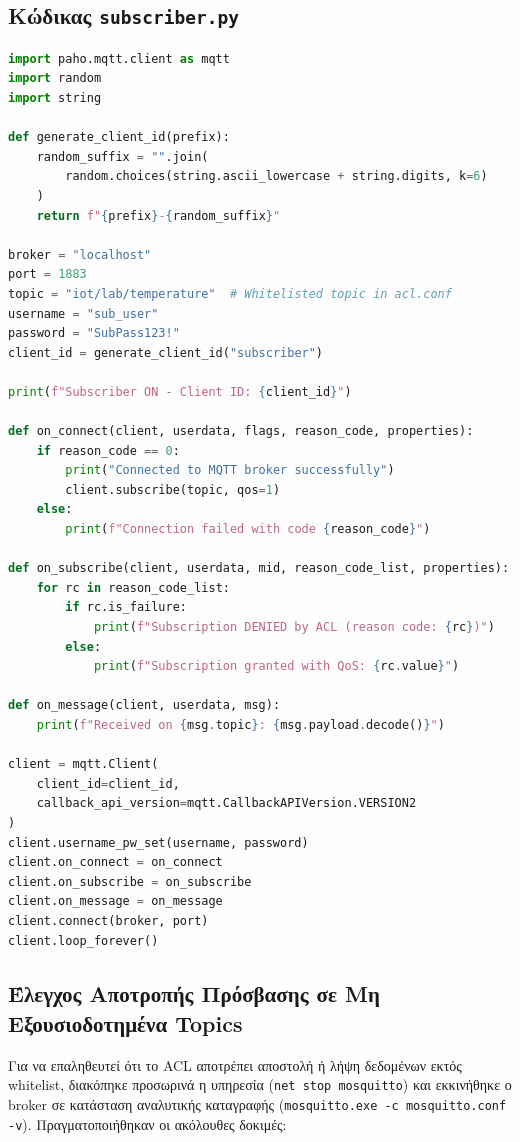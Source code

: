 \documentclass[11pt, a4paper]{article}
\begin{document}
\subsection{Κώδικας \texttt{subscriber.py}}
\begin{lstlisting}[language=Python]
import paho.mqtt.client as mqtt
import random
import string

def generate_client_id(prefix):
    random_suffix = "".join(
        random.choices(string.ascii_lowercase + string.digits, k=6)
    )
    return f"{prefix}-{random_suffix}"

broker = "localhost"
port = 1883
topic = "iot/lab/temperature"  # Whitelisted topic in acl.conf
username = "sub_user"
password = "SubPass123!"
client_id = generate_client_id("subscriber")

print(f"Subscriber ON - Client ID: {client_id}")

def on_connect(client, userdata, flags, reason_code, properties):
    if reason_code == 0:
        print("Connected to MQTT broker successfully")
        client.subscribe(topic, qos=1)
    else:
        print(f"Connection failed with code {reason_code}")

def on_subscribe(client, userdata, mid, reason_code_list, properties):
    for rc in reason_code_list:
        if rc.is_failure:
            print(f"Subscription DENIED by ACL (reason code: {rc})")
        else:
            print(f"Subscription granted with QoS: {rc.value}")

def on_message(client, userdata, msg):
    print(f"Received on {msg.topic}: {msg.payload.decode()}")

client = mqtt.Client(
    client_id=client_id,
    callback_api_version=mqtt.CallbackAPIVersion.VERSION2
)
client.username_pw_set(username, password)
client.on_connect = on_connect
client.on_subscribe = on_subscribe
client.on_message = on_message
client.connect(broker, port)
client.loop_forever()
\end{lstlisting}

\subsection{Έλεγχος Αποτροπής Πρόσβασης σε Μη Εξουσιοδοτημένα Topics}
Για να επαληθευτεί ότι το ACL αποτρέπει αποστολή ή λήψη δεδομένων εκτός whitelist, διακόπηκε προσωρινά η υπηρεσία (\texttt{net stop mosquitto}) και εκκινήθηκε ο broker σε κατάσταση αναλυτικής καταγραφής (\texttt{mosquitto.exe -c mosquitto.conf -v}). Πραγματοποιήθηκαν οι ακόλουθες δοκιμές:
\end{document}
